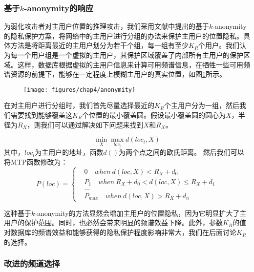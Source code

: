 \subsubsection{基于$k$-anonymity的响应}
为弱化攻击者对主用户位置的推理攻击，我们采用文献\cite{bahrak2014protecting}中提出的基于$k$-anonymity的隐私保护方案，将网络中的主用户进行分组的办法来保护主用户的位置隐私。具体方法是将距离最近的主用户划分为若干个组，每一组有至少$K_{R}$个用户。我们认为每一个用户组是一个虚拟的主用户，其保护区域覆盖了内部所有主用户的保护区域。这样，数据库根据虚拟的主用户信息来计算可用频谱信息，在牺牲一些可用频谱资源的前提下，能够在一定程度上模糊主用户的真实位置，如图\ref{fig:anonymity}所示。

\begin{figure}[!htp]\label{fig:anonymity}
  \centering
  \texttt{[image: figures/chap4/anonymity]}
\end{figure}
在对主用户进行分组时，我们首先尽量选择最近的$K_{R}$个主用户分为一组，然后我们需要找到能够覆盖这$K_{R}$个位置的最小覆盖圆。假设最小覆盖圆的圆心为$X$，半径为$R_{X}$，则我们可以通过解决如下问题来找到$X$和$R_{X}$。

\begin{equation}
\min_{X} \max_{loc_{i}} {d(loc_{i},X)}
\end{equation}
其中，$loc_{i}$为主用户的地址，函数$d()$为两个点之间的欧氏距离。
然后我们可以将MTP函数修改为：
\begin{equation}\label{equation:mtp-altered}
P(loc)=\left\{
\begin{aligned}
&0  \quad when \ d(loc,X)<R_{X}+ d_{0} \\
&P_{1} \quad when \ R_{X}+d_{0} < d(loc,X) \leq R_{X}+d_{1} \\
&... \\
&P_{max} \quad when \ d(loc,X) > R_{X}+d_{n}
\end{aligned}
\right.
\end{equation}

这种基于$k$-anonymity的方法显然会增加主用户的位置隐私，因为它明显扩大了主用户的保护范围。同时，也必然会带来明显的频谱效益下降。此外，参数$K_{R}$的值对数据库的频谱效益和能够获得的隐私保护程度影响非常大，我们在后面讨论$K_{R}$的选择。

\subsubsection{改进的频道选择}

